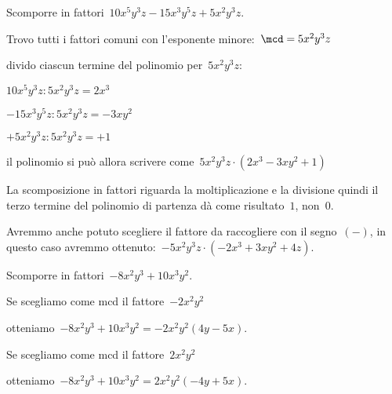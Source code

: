  \begin{esempio}
Scomporre in fattori~$10x^{5}y^{3}z-15x^{3}y^{5}z+5x^{2}y^{3}z$.
 \begin{enumeratea}
 \item Trovo tutti i fattori comuni con l'esponente minore:~$\mcd=5x^{2}y^{3}z$
 \item divido ciascun termine del polinomio per~$5x^{2}y^{3}z$:
   \begin{itemize*}
   \item $10x^{5}y^{3}z:5x^{2}y^{3}z=2x^{3}$
   \item $-15x^{3}y^{5}z:5x^{2}y^{3}z=-3xy^{2}$
   \item $+5x^{2}y^{3}z:5x^{2}y^{3}z=+1$
   \end{itemize*}
 \item il polinomio si può allora scrivere 
  come~$5x^{2}y^{3}z\cdot (2x^{3}-3xy^{2}+1)$
 \end{enumeratea}
 \end{esempio}

\osservazione La scomposizione in fattori riguarda la moltiplicazione e la 
 divisione quindi il terzo termine del polinomio di partenza dà come 
 risultato~$1$, non~$0$.
 
\osservazione Avremmo anche potuto scegliere il fattore da raccogliere 
 con il segno~$(-)$, in questo caso avremmo 
 ottenuto:~$-5x^{2}y^{3}z\cdot (-2x^{3}+3xy^{2}+4z)$.
 
 \begin{esempio}
Scomporre in fattori~$-8x^{2}y^{3}+10x^{3}y^{2}$.
 \begin{enumerate*}
 \item \begin{enumeratea}
  \item Se scegliamo come mcd il fattore~$-2x^{2}y^{2}$
  \item otteniamo~$-8x^{2}y^{3}+10x^{3}y^{2}=-2x^{2}y^{2}(4y-5x)$.
 \end{enumeratea}
 \item \begin{enumeratea}
  \item Se scegliamo come mcd il fattore~$2x^{2}y^{2}$
  \item otteniamo~$-8x^{2}y^{3}+10x^{3}y^{2}=2x^{2}y^{2}(-4y+5x)$.
 \end{enumeratea}
 \end{enumerate*}
 \end{esempio}



